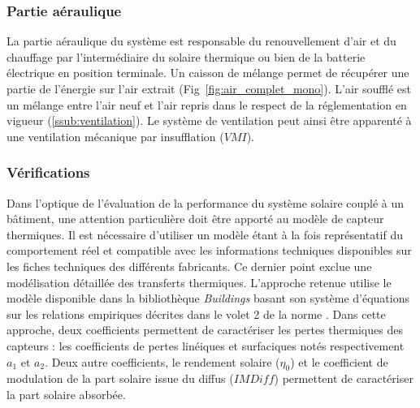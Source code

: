 \subsubsection{Partie aéraulique} %
\label{ssub:partie_aéraulique}
La partie aéraulique du système est responsable du renouvellement d’air et du chauffage
par l’intermédiaire du solaire thermique ou bien de la batterie électrique en
position terminale. Un caisson de mélange permet de récupérer une partie de l’énergie
sur l’air extrait (Fig~\ref{fig:air_complet_mono}). L’air soufflé est un mélange entre
l’air neuf et l’air repris dans le respect de la réglementation en vigueur (\ref{ssub:ventilation}).
Le système de ventilation peut ainsi être apparenté à une ventilation mécanique par insufflation
($VMI$).


\subsubsection{Vérifications} %
\label{ssub:verifications}
Dans l’optique de l’évaluation de la performance  du système solaire couplé à un bâtiment, une
attention particulière doit être apporté au modèle de capteur thermiques. Il est
nécessaire d’utiliser un modèle étant à la fois représentatif du comportement réel
et compatible avec les informations techniques disponibles sur les fiches techniques
des différents fabricants. Ce dernier point exclue une modélisation détaillée
des transferts thermiques. L’approche retenue utilise le modèle disponible dans la
bibliothèque \emph{Buildings} basant son système d’équations sur les relations
empiriques décrites dans le volet 2 de la norme \textcite{EN129752}.
Dans cette approche, deux coefficients
permettent de caractériser les pertes thermiques des capteurs : les coefficients de pertes linéiques
et surfaciques notés respectivement $a_{1}$ et $a_{2}$. Deux autre coefficients, le rendement solaire ($\eta_{0}$)
et le coefficient de modulation de la part solaire issue du diffus ($IMDiff$)
permettent de caractériser la part solaire absorbée.

